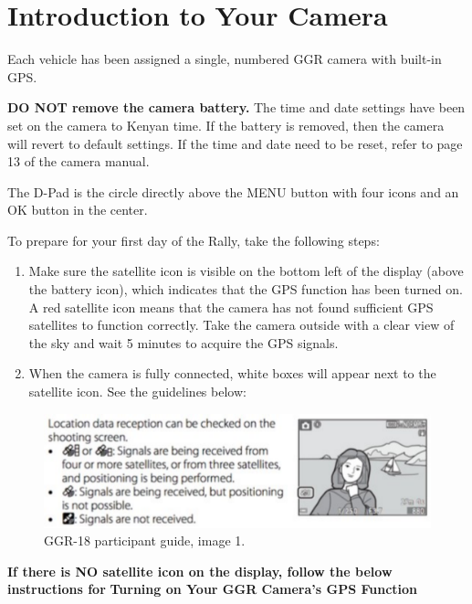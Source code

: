 \section{Introduction to Your Camera}

Each vehicle has been assigned a single, numbered GGR camera with built-in GPS.

\textbf{DO NOT remove the camera battery.} The time and date settings have been set on the camera to Kenyan time.  If the battery is removed, then the camera will revert to default settings.  If the time and date need to be reset, refer to page 13 of the camera manual.

The D-Pad is the circle directly above the MENU button with four icons and an OK button in the center.

To prepare for your first day of the Rally, take the following steps:
\begin{enumerate}
    \item Make sure the satellite icon is visible on the bottom left of the display (above the battery icon), which indicates that the GPS function has been turned on. A red satellite icon means that the camera has not found sufficient GPS satellites to function correctly. Take the camera outside with a clear view of the sky and wait 5 minutes to acquire the GPS signals.
    \item When the camera is fully connected, white boxes will appear next to the satellite icon. See the guidelines below:
\end{enumerate}

\begin{figure}[H]
    \begin{center}
        \includegraphics[width=0.8\linewidth]{resources/guide1.pdf}
    \end{center}
    \caption{GGR-18 participant guide, image 1.}
\end{figure}

\begin{center}
    \textbf{If there is NO satellite icon on the display, follow the below instructions for} \textbf{Turning on Your GGR Camera's GPS Function}
\end{center}

